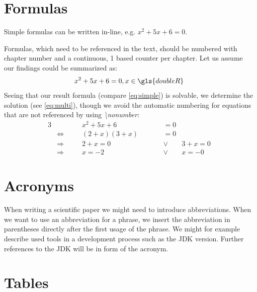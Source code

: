 \section{Formulas}
Simple formulas can be written in-line, e.g. \(x^2+5x+6=0\).
\begin{samepage}
	 Formulas, which need to be referenced in the text, should be numbered with chapter number and a continuous, 1 based counter per chapter. Let us assume our findings could be summarized as:
	\nopagebreak
	\begin{equation}
		\label{eq:simple}
		x^2+5x+6=0, x \in \gls{doubleR}
	\end{equation}
	Seeing that our result formula (compare \ref{eq:simple}) is solvable, we determine the solution (see \ref{eq:multi}), though we avoid the automatic numbering for equations that are not referenced by using \textit{\textbackslash nonumber}:
	\nopagebreak
	\begin{alignat}{3}
		& \quad && x^2+5x+6                   \qquad && = 0  \nonumber \\
		& \Leftrightarrow \quad && (2+x)(3+x) \qquad && = 0 \nonumber \\
		& \Rightarrow     \quad && 2+x=0      \qquad && \lor \qquad 3+x=0 \nonumber \\
		& \Rightarrow 	  \quad && x=-2       \qquad && \lor \qquad x =-0 \label{eq:multi} 
	\end{alignat}
\end{samepage}


\section{Acronyms}
When writing a scientific paper we might need to introduce abbreviations. When we want to use an abbreviation for a phrase, we insert the abbreviation in parentheses directly after the first usage of the phrase. We might for example describe used tools in a development process such as the \gls{JDK} version. Further references to the \gls{JDK} will be in form of the acronym.\par


\section{Tables}

